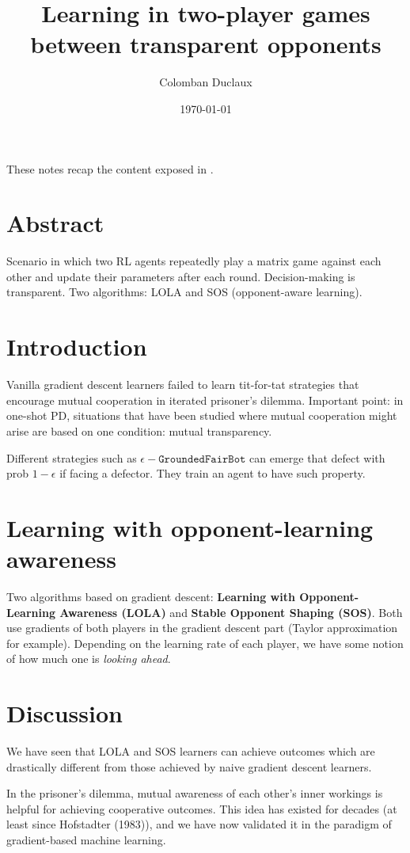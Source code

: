 \documentclass{article}
\title{Learning in two-player games between
transparent opponents}
\author{Colomban Duclaux}
\date{\today}
\begin{document}
\maketitle
These notes recap the content exposed in \cite{hutter2021learningtwoplayergamestransparent}.

\section{Abstract}
Scenario in which two RL agents repeatedly play a matrix game against each other and update their parameters after each round. Decision-making is transparent.
Two algorithms: LOLA and SOS (opponent-aware learning).

\section{Introduction}
Vanilla gradient descent learners failed to learn tit-for-tat strategies that encourage mutual cooperation in iterated prisoner's dilemma.
Important point: in one-shot PD, situations that have been studied where mutual cooperation might arise are based on one condition: mutual transparency.

Different strategies such as $\epsilon-\texttt{GroundedFairBot}$ can emerge that defect with prob $1-\epsilon$ if facing a defector. They train an agent to have such property.

\section{Learning with opponent-learning awareness}
Two algorithms based on gradient descent: \textbf{Learning with Opponent-Learning Awareness (LOLA)} and \textbf{Stable Opponent Shaping (SOS)}.
Both use gradients of both players in the gradient descent part (Taylor approximation for example).
Depending on the learning rate of each player, we have some notion of how much one is \textit{looking ahead}.

\section{Discussion}
We have seen that LOLA and SOS learners can
achieve outcomes which are drastically different from those achieved by naive
gradient descent learners.

In the prisoner’s dilemma, mutual awareness of each other’s inner workings
is helpful for achieving cooperative outcomes. This idea has existed for decades
(at least since Hofstadter (1983)), and we have now validated it in the paradigm
of gradient-based machine learning.
\end{document}
